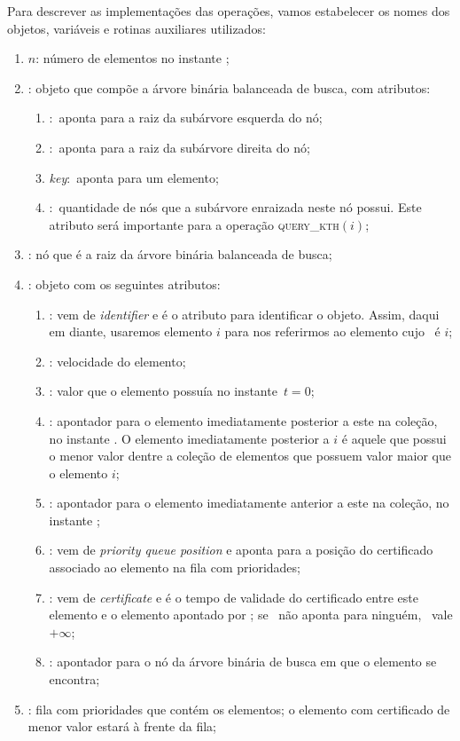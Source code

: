 Para descrever as implementações das operações, vamos
estabelecer os nomes dos objetos, variáveis e rotinas
auxiliares utilizados:
\begin{enumerate}
    \item $n$: número de elementos no instante \now;
    \item \no: objeto que compõe a árvore binária balanceada
            de busca, com atributos:
    \begin{enumerate}
        \item \esq$:$ aponta para a raiz da subárvore
        esquerda do nó;
        \item \dir$:$ aponta para a raiz da subárvore
        direita do nó;
        \item \textit{key}$:$ aponta para um elemento;
        \item \children$:$ quantidade de nós que a subárvore
        enraizada neste nó possui. Este atributo será importante
        para a operação \textsc{query\_kth}$(i)$;
    \end{enumerate}
    \item \raiz: nó que é a raiz da árvore binária balanceada de
                busca;
    \item \elemento: objeto com os seguintes atributos:
    \begin{enumerate}
        \item \id: vem de \textit{identifier} e é o atributo
        para identificar o objeto. Assim, daqui
        em diante, usaremos elemento $i$ para nos
        referirmos ao elemento cujo \id~é $i$;
        \item \speed: velocidade do elemento;
        \item \initv: valor que o elemento possuía no
        instante~$t = 0$;
        \item \nex: apontador para o elemento imediatamente
        posterior a este na coleção, no instante \now. O
        elemento imediatamente posterior a $i$ é aquele
        que possui o menor valor dentre a coleção de
        elementos que possuem valor maior que o elemento
        $i$;
        \item \prev: apontador para o elemento imediatamente
        anterior a este na coleção, no instante \now;
        \item \pqpos: vem de \textit{priority queue position} e
        aponta para a posição do certificado associado
        ao elemento na fila com prioridades;
        \item \cert: vem de \textit{certificate} e é o tempo
        de validade do certificado entre este elemento
        e o elemento apontado por \prev; se \prev~não
        aponta para ninguém, \cert~vale $+\infty$;
        \item \no: apontador para o nó da árvore binária de busca em
        que o elemento se encontra;
    \end{enumerate}
    \item \Q: fila com prioridades que contém os elementos; o
    elemento com certificado de menor valor estará à frente da fila;


\end{enumerate}
